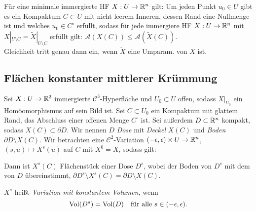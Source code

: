 \documentclass{cheat-sheet}
\newcommand{\A}{\mathcal{A}} %
\newcommand{\Cont}{\mathcal{C}} %
\begin{document}
\begin{samepage}

\begin{satz}
  Für eine minimale immergierte HF $X : U \to \mathbb{R}^n$ gilt: Um jeden Punkt $u_0 \in U$ gibt es ein Kompaktum $C \subset U$ mit nicht leerem Inneren, dessen Rand eine Nullmenge ist und welches $u_0 \in C^\circ$ erfüllt, sodass für jede immergiere HF $\tilde{X} : U \to \mathbb{R}^n$ mit $X|_{U \setminus C} = \tilde{X}|_{U \setminus C}$ erfüllt gilt: $\A(X(C)) \leq \A(\tilde{X}(C))$. \\
  Gleichheit tritt genau dann ein, wenn $\tilde{X}$ eine Umparam. von $X$ ist.
\end{satz}



\subsection{Flächen konstanter mittlerer Krümmung}

\end{samepage}

\begin{situation}
  Sei $X : U \to \mathbb{R}^2$ immergierte $\Cont^3$-Hyperfläche und $U_0 \subset U$ offen, sodass $X|_{U_0}$ ein Homöomorphismus auf sein Bild ist. Sei $C \subset U_0$ ein Kompaktum mit glattem Rand, das Abschluss einer offenen Menge $C^\circ$ ist. Sei außerdem $D \subset \mathbb{R}^n$ kompakt, sodass $X(C) \subset \partial D$. Wir nennen $D$ \emph{Dose} mit \emph{Deckel} $X(C)$ und \emph{Boden} $\partial D \setminus X(C)$. Wir betrachten eine $\Cont^2$-Variation $\left( -\epsilon, \epsilon \right) \times U \to \mathbb{R}^n$, $(s, u) \mapsto X^s(u)$ auf $C$ mit $X^0 = X$, sodass gilt:

  \begin{itemize}
  \end{itemize}

  Dann ist $X^s(C)$ Flächenstück einer Dose $D^s$, wobei der Boden von $D^s$ mit dem von $D$ übereinstimmt, \dh{} $\partial D^s \setminus X^s(C) = \partial D \setminus X(C)$.
\end{situation}

\begin{defn}
  $X^s$ heißt \emph{Variation mit konstantem Volumen}, wenn
  \[
    \mathrm{Vol}(D^s) = \mathrm{Vol}(D)
    \quad \text{für alle $s \in \left( -\epsilon, \epsilon \right)$}.
  \]
\end{defn}
\end{document}
